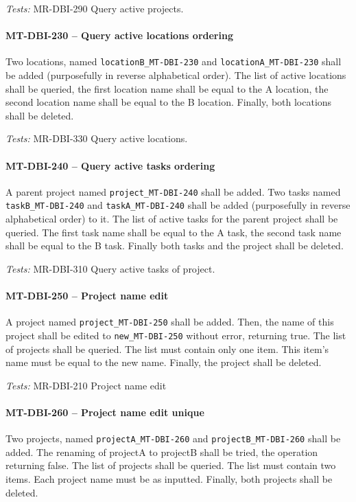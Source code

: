 \textit{Tests: } MR-DBI-290 Query active projects.

\paragraph{MT-DBI-230 -- Query active locations ordering}
Two locations, named \lstinline{locationB_MT-DBI-230}
and \lstinline{locationA_MT-DBI-230} shall be added
(purposefully in reverse alphabetical order).
The list of active locations shall be queried, the first
location name shall be equal to the A location,
the second location name shall be equal to the B location.
Finally, both locations shall be deleted.

\textit{Tests: } MR-DBI-330 Query active locations.

\paragraph{MT-DBI-240 -- Query active tasks ordering}
A parent project named \lstinline{project_MT-DBI-240} shall be added.
Two tasks named \lstinline{taskB_MT-DBI-240} and \lstinline{taskA_MT-DBI-240}
shall be added (purposefully in reverse alphabetical order) to it.
The list of active tasks for the parent project shall be queried.
The first task name shall be equal to the A task, the second task name
shall be equal to the B task.
Finally both tasks and the project shall be deleted.

\textit{Tests: } MR-DBI-310 Query active tasks of project.

\paragraph{MT-DBI-250 -- Project name edit}
A project named \lstinline{project_MT-DBI-250} shall be added.
Then, the name of this project shall be edited to \lstinline{new_MT-DBI-250}
without error, returning true.
The list of projects shall be queried. The list must contain only one item.
This item's name must be equal to the new name.
Finally, the project shall be deleted.

\textit{Tests: } MR-DBI-210 Project name edit

\paragraph{MT-DBI-260 -- Project name edit unique}
Two projects, named \lstinline{projectA_MT-DBI-260} and
\lstinline{projectB_MT-DBI-260} shall be added.
The renaming of projectA to projectB shall be tried, the operation
returning false.
The list of projects shall be queried. The list must contain two items.
Each project name must be as inputted.
Finally, both projects shall be deleted.

